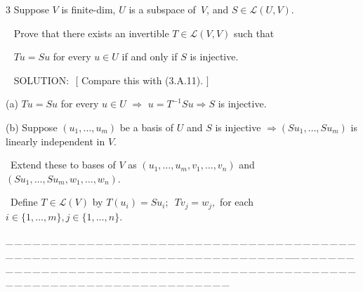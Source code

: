 \documentclass[a4paper, 11pt, UTF8]{article}
\def\Lm{\mathcal{L}}
\begin{document}
\begin{large}
{\timesbf\Large 3} {\timessl\Large 
Suppose $V$ is finite-dim, $U$ is a subspace of \,$V$, and $S\in\Lm(U, V)$.}\par\,\,\,
{\timessl\Large Prove that there exists an invertible $T\in\Lm(V,V)$ such that}\par\,\,\,
{\timessl\Large $Tu = Su$ for every $u\in U$ if and only if $S$ is injective.}\par\,\,\,
{\timesbf S\footnotesize{OLUTION:}}\,\,\,\,{\timessl $[$ Compare this with (3.A.11). $]$}\par\quad
(a) $Tu = Su$ for every $u\in U$ $\Rightarrow$ $u=T^{-1}Su\Rightarrow S$ is injective.\par\quad
(b) Suppose $(u_1,\dots,u_m)$ be a basis of $U$ and $S$ is injective $\Rightarrow(Su_1,\dots,Su_m)$ is linearly independent in $V$.\par\qquad\,
Extend these to bases of $V$ as $(u_1,\dots,u_m,v_1,\dots,v_n)$ and $(Su_1,\dots,Su_m,w_1,\dots,w_n)$.\par\qquad\,
Define $T\in\Lm(V)$ by $T(u_i)=Su_i;\,\,\,Tv_j=w_j,$ for each $i\in\{1,\dots,m\},j\in\{1,\dots,n\}$.\par
{\tiny \_\,\_\,\_\,\_\,\_\,\_\,\_\,\_\,\_\,\_\,\_\,\_\,\_\,\_\,\_\,\_\,\_\,\_\,\_\,\_\,\_\,\_\,\_\,\_\,\_\,\_\,\_\,\_\,\_\,\_\,\_\,\_\,\_\,\_\,\_\,\_\,\_\,\_\,\_\,\_\,\_\,\_\,\_\,\_\,\_\,\_\,\_\,\_\,\_\,\_\,\_\,\_\,\_\,\_\,\_\,\_\,\_\,\_\,\_\,\_\,\_\,\_\,\_\,\_\,\_\,\_\,\_\,\_\,\_\,\_\,\_\_\,\_\,\_\,\_\,\_\,\_\,\_\,\_\,\_\,\_\,\_\,\_\,\_\,\_\,\_\,\_\,\_\,\_\,\_\,\_\,\_\,\_\,\_\,\_\,\_\,\_\,\_\,\_\,\_\,\_\,\_\,\_\,\_\,\_\,\_\,\_\,\_\,\_\,\_\,\_\,\_\,\_\,\_\,\_\,\_\,\_\,\_\,\_\,\_\,\_\,\_\,\_\,\_\,\_\,\_\,\_\,\_\,\_\,\_\,\_\,\_\,\_\,\_\,\_\,\_\,\_\,\_\,\_\,\_\,\_\,\_}\par


\end{large}
\end{document}

